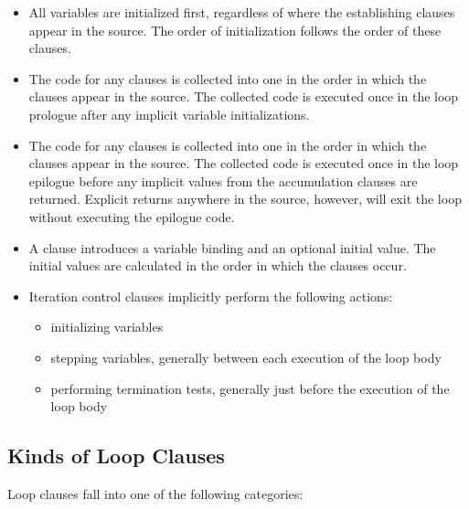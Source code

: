 \begin{new}
  \begin{itemize}

  \item
  All variables are initialized first, regardless of where the establishing
  clauses appear in the source.  The order of initialization follows the
  order of these clauses.

  \item
  The code for any  clauses is collected
  into one  in the order in which the clauses appear in
  the source.  The collected code is executed once in the loop prologue
  after any implicit variable initializations.

  \item
  The code for any  clauses is collected 
  into one  in the order in which the clauses appear in
  the source.  The collected code is executed once in the loop epilogue
  before any implicit values from the accumulation clauses are returned.
  Explicit returns anywhere in the source, however, will exit the loop
  without executing the epilogue code.

  \item 
  A  clause introduces a variable binding and an optional
  initial value.  The initial values are calculated in the order in
  which the  clauses occur.

  \item 
  Iteration control clauses implicitly perform the following actions:
  \begin{itemize}
  \item
  initializing variables

  \item
  stepping variables, generally between each execution of the loop body

  \item
  performing termination tests, generally just before the execution of the
  loop body
  \end{itemize}
  \end{itemize}

  \subsection{Kinds of Loop Clauses}
\label{LOOP-KINDS-SECTION}

  Loop clauses fall into one of the following categories:

  \begin{itemize}


\end{itemize}
\end{new}
